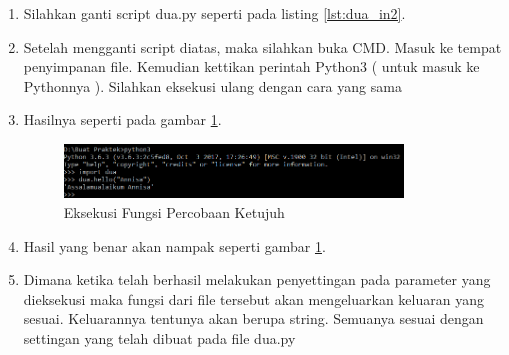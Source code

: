 \begin{enumerate}
\item Silahkan ganti script dua.py seperti pada listing \ref{lst:dua_in2}.

\item Setelah mengganti script diatas, maka silahkan buka CMD. Masuk ke tempat penyimpanan file. Kemudian kettikan perintah Python3 ( untuk masuk ke Pythonnya ). Silahkan eksekusi ulang dengan cara yang sama
\item Hasilnya seperti pada gambar \ref{fig:eksekusi_fungsi7}.
\begin{figure}[!htbp]
	\centerline{\includegraphics[width=0.85\textwidth]{figures/8/eksekusi_fungsi7.png}}
	\caption{Eksekusi Fungsi Percobaan Ketujuh}
	\label{fig:eksekusi_fungsi7}
\end{figure}
\item Hasil yang benar akan nampak seperti gambar \ref{fig:eksekusi_fungsi7}.
\item Dimana ketika telah berhasil melakukan penyettingan pada parameter yang dieksekusi maka fungsi dari file tersebut akan mengeluarkan keluaran yang sesuai. Keluarannya tentunya akan berupa string. Semuanya sesuai dengan settingan yang telah dibuat pada file dua.py
\end{enumerate}

